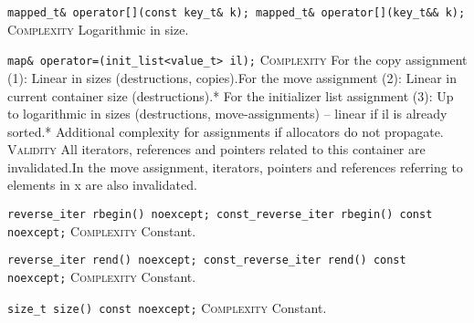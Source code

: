 \noindent{}\hspace*{0.25em}\lstinline[basicstyle=\ttfamily\color{clime}]{mapped_t& operator[](const key_t& k); mapped_t& operator[](key_t&& k);} \textsc{Complexity} Logarithmic in size.\\\vspace{-0.6em}

\noindent{}\hspace*{0.25em}\lstinline[basicstyle=\ttfamily\color{corange}]{map& operator=(init_list<value_t> il);} \textsc{Complexity} For the copy assignment (1): Linear in sizes (destructions, copies).For the move assignment (2): Linear in current container size (destructions).* For the initializer list assignment (3): Up to logarithmic in sizes (destructions, move-assignments) -- linear if il is already sorted.* Additional complexity for assignments if allocators do not propagate. \textsc{Validity} All iterators, references and pointers related to this container are invalidated.In the move assignment, iterators, pointers and references referring to elements in x are also invalidated.\\\vspace{-0.6em}

\noindent{}\hspace*{0.25em}\lstinline[basicstyle=\ttfamily\color{cgreen}]{reverse_iter rbegin() noexcept; const_reverse_iter rbegin() const noexcept;} \textsc{Complexity} Constant.\\\vspace{-0.6em}

\noindent{}\hspace*{0.25em}\lstinline[basicstyle=\ttfamily\color{cgreen}]{reverse_iter rend() noexcept; const_reverse_iter rend() const noexcept;} \textsc{Complexity} Constant.\\\vspace{-0.6em}

\noindent{}\hspace*{0.25em}\lstinline[basicstyle=\ttfamily\color{cgreen}]{size_t size() const noexcept;} \textsc{Complexity} Constant.\\\vspace{-0.6em}

